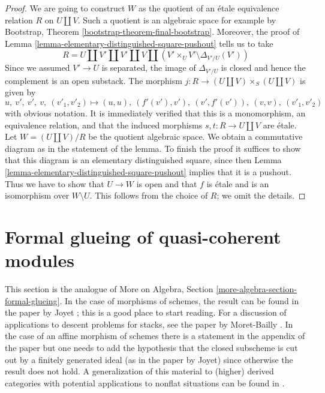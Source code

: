 \begin{proof}
We are going to construct $W$ as the quotient of an \'etale
equivalence relation $R$ on $U \amalg V$. Such a quotient is an
algebraic space for example by
Bootstrap, Theorem \ref{bootstrap-theorem-final-bootstrap}.
Moreover, the proof of
Lemma \ref{lemma-elementary-distinguished-square-pushout} tells us to take
$$
R = U \amalg V' \amalg V' \amalg V \amalg
(V' \times_U V' \setminus \Delta_{V'/U}(V'))
$$
Since we assumed $V' \to U$ is separated, the image of
$\Delta_{V'/U}$ is closed and hence the complement is an
open substack. The morphism $j : R \to (U \amalg V) \times_S (U \amalg V)$
is given by
$$
u,\ v',\ v',\ v,\ (v'_1, v'_2) \mapsto
(u, u),\ (f'(v'), v'),\ (v', f'(v')),\ (v, v),\ (v'_1, v'_2)
$$
with obvious notation. It is immediately verified that this is a
monomorphism, an equivalence relation, and that the induced morphisms
$s, t : R \to U \amalg V$ are \'etale. Let
$W = (U \amalg V)/R$ be the quotient algebraic space.
We obtain a commutative diagram as in the statement of the lemma.
To finish the proof it suffices to show that this diagram is
an elementary distinguished square, since then
Lemma \ref{lemma-elementary-distinguished-square-pushout}
implies that it is a pushout.
Thus we have to show that $U \to W$ is open and that
$f$ is \'etale and is an isomorphism over $W \setminus U$.
This follows from the choice of $R$; we omit the details.
\end{proof}






\section{Formal glueing of quasi-coherent modules}
\label{section-formal-glueing}

\noindent
This section is the analogue of
More on Algebra, Section \ref{more-algebra-section-formal-glueing}.
In the case of morphisms of schemes, the result can be found in
the paper by Joyet \cite{Joyet}; this is a good place to start reading.
For a discussion of applications to descent problems for stacks, see the
paper by Moret-Bailly \cite{MB}. In the case of an affine
morphism of schemes there is a statement in the appendix of the paper
\cite{Ferrand-Raynaud} but one needs to add the hypothesis
that the closed subscheme is cut out by a finitely generated
ideal (as in the paper by Joyet) since otherwise the result does not hold.
A generalization of this material to (higher) derived categories
with potential applications to nonflat situations
can be found in \cite[Section 5]{Bhatt-Algebraize}.

